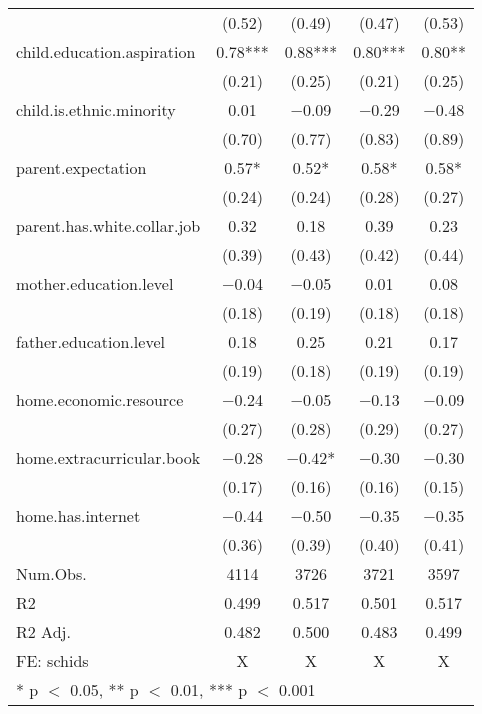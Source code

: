 \documentclass[
  man,floatsintext]{apa7}
\begin{document}
\begin{table}
\begin{tabular}[t]{lcccc}
 & (\num{0.52}) & (\num{0.49}) & (\num{0.47}) & (\num{0.53})\\
child.education.aspiration & \num{0.78}*** & \num{0.88}*** & \num{0.80}*** & \num{0.80}**\\
 & (\num{0.21}) & (\num{0.25}) & (\num{0.21}) & (\num{0.25})\\
child.is.ethnic.minority & \num{0.01} & \num{-0.09} & \num{-0.29} & \num{-0.48}\\
 & (\num{0.70}) & (\num{0.77}) & (\num{0.83}) & (\num{0.89})\\
parent.expectation & \num{0.57}* & \num{0.52}* & \num{0.58}* & \num{0.58}*\\
 & (\num{0.24}) & (\num{0.24}) & (\num{0.28}) & (\num{0.27})\\
parent.has.white.collar.job & \num{0.32} & \num{0.18} & \num{0.39} & \num{0.23}\\
 & (\num{0.39}) & (\num{0.43}) & (\num{0.42}) & (\num{0.44})\\
mother.education.level & \num{-0.04} & \num{-0.05} & \num{0.01} & \num{0.08}\\
 & (\num{0.18}) & (\num{0.19}) & (\num{0.18}) & (\num{0.18})\\
father.education.level & \num{0.18} & \num{0.25} & \num{0.21} & \num{0.17}\\
 & (\num{0.19}) & (\num{0.18}) & (\num{0.19}) & (\num{0.19})\\
home.economic.resource & \num{-0.24} & \num{-0.05} & \num{-0.13} & \num{-0.09}\\
 & (\num{0.27}) & (\num{0.28}) & (\num{0.29}) & (\num{0.27})\\
home.extracurricular.book & \num{-0.28} & \num{-0.42}* & \num{-0.30} & \num{-0.30}\\
 & (\num{0.17}) & (\num{0.16}) & (\num{0.16}) & (\num{0.15})\\
home.has.internet & \num{-0.44} & \num{-0.50} & \num{-0.35} & \num{-0.35}\\
 & (\num{0.36}) & (\num{0.39}) & (\num{0.40}) & (\num{0.41})\\
\midrule
Num.Obs. & \num{4114} & \num{3726} & \num{3721} & \num{3597}\\
R2 & \num{0.499} & \num{0.517} & \num{0.501} & \num{0.517}\\
R2 Adj. & \num{0.482} & \num{0.500} & \num{0.483} & \num{0.499}\\
FE: schids & X & X & X & X\\
\bottomrule
\multicolumn{5}{l}{\rule{0pt}{1em}* p $<$ 0.05, ** p $<$ 0.01, *** p $<$ 0.001}\\
\end{tabular}
\end{table}
\end{document}
